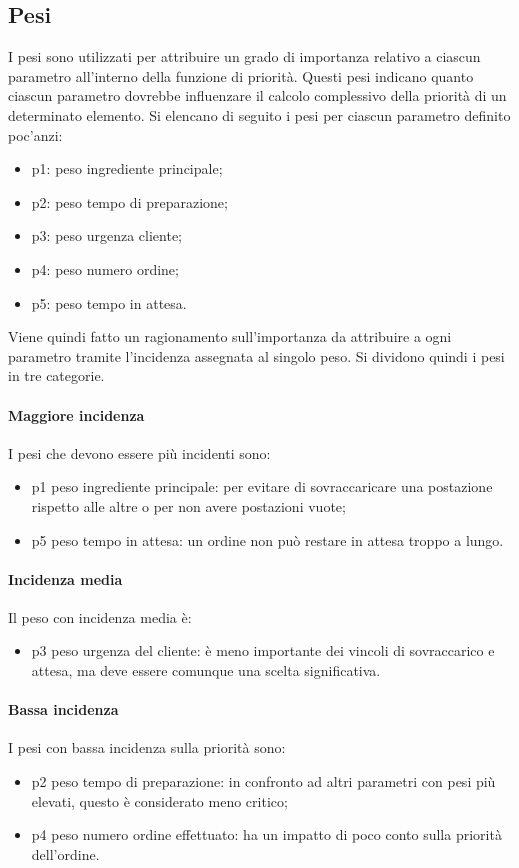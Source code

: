 \subsection{Pesi}
I pesi sono utilizzati per attribuire un grado di importanza relativo a ciascun parametro all'interno della funzione di priorità. Questi pesi indicano quanto ciascun parametro dovrebbe influenzare il calcolo complessivo della priorità di un determinato elemento.
Si elencano di seguito i pesi per ciascun parametro definito poc’anzi:
\begin{itemize}
	\item p1: peso ingrediente principale;
	\item p2: peso tempo di preparazione;
	\item p3: peso urgenza cliente;
	\item p4: peso numero ordine;
	\item p5: peso tempo in attesa.
\end{itemize}

Viene quindi fatto un ragionamento sull’importanza da attribuire a ogni parametro tramite l’incidenza assegnata al singolo peso. Si dividono quindi i pesi in tre categorie.

\paragraph{Maggiore incidenza} I pesi che devono essere più incidenti sono:
\begin{itemize}
	\item p1 peso ingrediente principale: per evitare di sovraccaricare una postazione rispetto alle altre o per non avere postazioni vuote;
	\item p5 peso tempo in attesa: un ordine non può restare in attesa troppo a lungo.
\end{itemize}

\paragraph{Incidenza media} Il peso con incidenza media è:
\begin{itemize}
	\item p3 peso urgenza del cliente: è meno importante dei vincoli di sovraccarico e attesa, ma deve essere comunque una scelta significativa.
\end{itemize}

\paragraph{Bassa incidenza} I pesi con bassa incidenza sulla priorità sono:
\begin{itemize}
	\item p2 peso tempo di preparazione: in confronto ad altri parametri con pesi più elevati, questo è considerato meno critico;
	\item p4 peso numero ordine effettuato: ha un impatto di poco conto sulla priorità dell’ordine.
\end{itemize}

